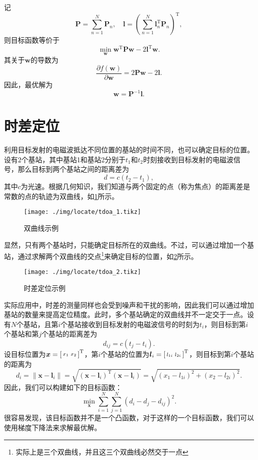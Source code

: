 记
\[
    \mathbf{P} = \sum_{n=1}^{N} \mathbf{P}_n, \quad
    \bm{l} = \left(\sum_{n=1}^{N} \bm{l}_n^{\mathrm{T}} \mathbf{P}_n\right)^{\mathrm{T}},
\]
则目标函数等价于
\[
    \min_{\bm{w}} \bm{w}^{\mathrm{T}} \mathbf{P} \bm{w} - 2 \bm{l}^{\mathrm{T}} \bm{w}.
\]
其关于\( \bm{w} \)的导数为
\[
    \frac{\partial f(\bm{w})}{\partial \bm{w}} = 2 \mathbf{P} \bm{w} - 2 \bm{l}.
\]
因此，最优解为
\[
    \bm{w} = \mathbf{P}^{-1} \bm{l}.
\]

\section{时差定位}

利用目标发射的电磁波抵达不同位置的基站的时间不同，也可以确定目标的位置。设有\( 2 \)个基站，其中基站1和基站2分别于\( t_1 \)和\( t_2 \)时刻接收到目标发射的电磁波信号，那么目标到两个基站之间的距离差为
\[
    d = c (t_2 - t_1),
\]
其中\( c \)为光速。根据几何知识，我们知道与两个固定的点（称为焦点）的距离差是常数的点的轨迹为双曲线，如\cref{fig_hyerbola}所示。

\begin{figure}[htb!]
    \centering
    \texttt{[image: ./img/locate/tdoa\_1.tikz]}
    \caption{双曲线示例}
    \label{fig_hyerbola}
\end{figure}

显然，只有两个基站时，只能确定目标所在的双曲线。不过，可以通过增加一个基站，通过求解两个双曲线的交点\footnote{实际上是三个双曲线，并且这三个双曲线必然交于一点}来确定目标的位置，如\cref{fig_tdoa}所示。

\begin{figure}[htb!]
    \centering
    \texttt{[image: ./img/locate/tdoa\_2.tikz]}
    \caption{时差定位示例}
    \label{fig_tdoa}
\end{figure}

实际应用中，时差的测量同样也会受到噪声和干扰的影响，因此我们可以通过增加基站的数量来提高定位精度。此时，多个基站确定的双曲线并不一定交于一点。设有\( N \)个基站，且第\( i \)个基站接收到目标发射的电磁波信号的时刻为\( t_i \)，则目标到第\( i \)个基站和第\( j \)个基站的距离差为
\[
    d_{ij} = c (t_j - t_i).
\]
设目标位置为\( \boldsymbol{x} = \begin{bsmallmatrix} x_1 & x_2 \end{bsmallmatrix}^{\mathrm{T}} \)，第\( i \)个基站的位置为\( \boldsymbol{l}_i = \begin{bsmallmatrix} l_{1i} & l_{2i} \end{bsmallmatrix}^{\mathrm{T}} \)，则目标到第\( i \)个基站的距离为
\[
    d_i = \left\| \bm{x} - \bm{l}_i \right\| = \sqrt{(\bm{x} - \bm{l}_i)^{\mathrm{T}} (\bm{x} - \bm{l}_i)} = \sqrt{(x_1 - l_{1i})^2 + (x_2 - l_{2i})^2}.
\]
因此，我们可以构建如下的目标函数：
\[
    \min_{\bm{x}} \sum_{i=1}^{N} \sum_{j=1}^{N} (d_i - d_j - d_{ij})^2.
\]
很容易发现，该目标函数并不是一个凸函数，对于这样的一个目标函数，我们可以使用梯度下降法来求解最优解。


